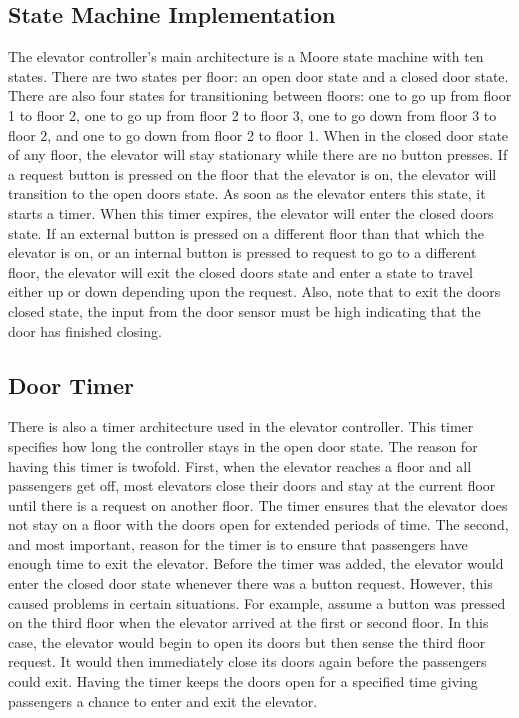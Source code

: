 \documentclass[journal]{IEEEtran}
\begin{document}
\subsection{State Machine Implementation}
The elevator controller’s main architecture is a Moore state machine with ten states. There are two states per floor: an open door state and a closed door state. There are also four states for transitioning between floors: one to go up from floor 1 to floor 2, one to go up from floor 2 to floor 3, one to go down from floor 3 to floor 2, and one to go down from floor 2 to floor 1. When in the closed door state of any floor, the elevator will stay stationary while there are no button presses. If a request button is pressed on the floor that the elevator is on, the elevator will transition to the open doors state. As soon as the elevator enters this state, it starts a timer. When this timer expires, the elevator will enter the closed doors state. If an external button is pressed on a different floor than that which the elevator is on, or an internal button is pressed to request to go to a different floor, the elevator will exit the closed doors state and enter a state to travel either up or down depending upon the request. Also, note that to exit the doors closed state, the input from the door sensor must be high indicating that the door has finished closing.

\subsection{Door Timer}
There is also a timer architecture used in the elevator controller. This timer specifies how long the controller stays in the open door state. The reason for having this timer is twofold. First, when the elevator reaches a floor and all passengers get off, most elevators close their doors and stay at the current floor until there is a request on another floor. The timer ensures that the elevator does not stay on a floor with the doors open for extended periods of time. The second, and most important, reason for the timer is to ensure that passengers have enough time to exit the elevator. Before the timer was added, the elevator would enter the closed door state whenever there was a button request. However, this caused problems in certain situations. For example, assume a button was pressed on the third floor when the elevator arrived at the first or second floor. In this case, the elevator would begin to open its doors but then sense the third floor request. It would then immediately close its doors again before the passengers could exit. Having the timer keeps the doors open for a specified time giving passengers a chance to enter and exit the elevator.
\end{document}
